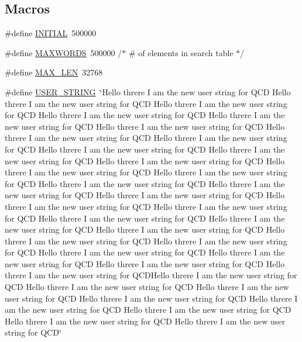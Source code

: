 \subsection*{Macros}
\begin{DoxyCompactItemize}
\item 
\#define \mbox{\hyperlink{adat-devel_2other__libs_2filedb_2filehash_2treplace_8c_aa3d063564f6ab16f6d408b8369d0e9ff}{I\+N\+I\+T\+I\+AL}}~500000
\item 
\#define \mbox{\hyperlink{adat-devel_2other__libs_2filedb_2filehash_2treplace_8c_aa6b319146daf33409da1bbe4194553dc}{M\+A\+X\+W\+O\+R\+DS}}~500000	              /$\ast$ \# of elements in search table $\ast$/
\item 
\#define \mbox{\hyperlink{adat-devel_2other__libs_2filedb_2filehash_2treplace_8c_aabf4f709c8199e41cf279c77112345fe}{M\+A\+X\+\_\+\+L\+EN}}~32768
\item 
\#define \mbox{\hyperlink{adat-devel_2other__libs_2filedb_2filehash_2treplace_8c_a5fdc86a0c07ccece3ef65e2f46c0ffd4}{U\+S\+E\+R\+\_\+\+S\+T\+R\+I\+NG}}~\char`\"{}Hello threre I am the new user string for Q\+CD Hello threre I am the new user string for Q\+CD Hello threre I am the new user string for Q\+CD Hello threre I am the new user string for Q\+CD Hello threre I am the new user string for Q\+CD Hello threre I am the new user string for Q\+CD Hello threre I am the new user string for Q\+CD Hello threre I am the new user string for Q\+CD Hello threre I am the new user string for Q\+CD Hello threre I am the new user string for Q\+CD Hello threre I am the new user string for Q\+CD Hello threre I am the new user string for Q\+CD Hello threre I am the new user string for Q\+CD Hello threre I am the new user string for Q\+CD Hello threre I am the new user string for Q\+CD Hello threre I am the new user string for Q\+CD Hello threre I am the new user string for Q\+CD Hello threre I am the new user string for Q\+CD Hello threre I am the new user string for Q\+CD Hello threre I am the new user string for Q\+CD Hello threre I am the new user string for Q\+CD Hello threre I am the new user string for Q\+CD Hello threre I am the new user string for Q\+CD Hello threre I am the new user string for Q\+CD Hello threre I am the new user string for Q\+CD Hello threre I am the new user string for Q\+CD Hello threre I am the new user string for Q\+C\+D\+Hello threre I am the new user string for Q\+CD  Hello threre I am the new user string for Q\+CD Hello threre I am the new user string for Q\+CD Hello threre I am the new user string for Q\+CD Hello threre I am the new user string for Q\+CD Hello threre I am the new user string for Q\+CD Hello threre I am the new user string for Q\+CD Hello threre I am the new user string for Q\+CD\char`\"{}
\end{DoxyCompactItemize}

